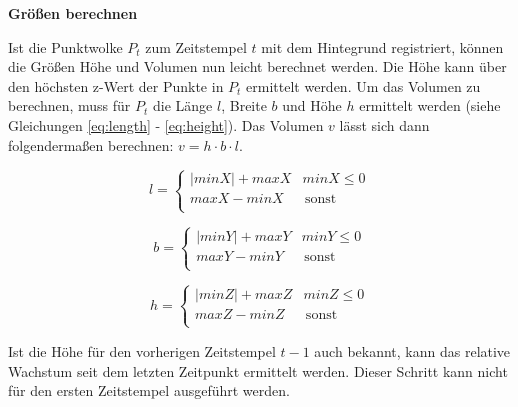 \documentclass[12pt,titlepage, twoside]{article}
\begin{document}
\textbf{Größen berechnen}

Ist die Punktwolke $P_t$ zum Zeitstempel $t$ mit dem Hintegrund registriert, können die Größen Höhe und Volumen nun leicht berechnet werden.
Die Höhe kann über den höchsten z-Wert der Punkte in $P_t$ ermittelt werden. Um das Volumen zu berechnen, muss für $P_t$ die Länge $l$, Breite $b$ und Höhe $h$ ermittelt werden (siehe Gleichungen \ref{eq:length} - \ref{eq:height}). 
Das Volumen $v$ lässt sich dann folgendermaßen berechnen: $v = h \cdot b \cdot l$.

\begin{equation}
    \label{eq:length}
    l = \left\{
    \begin{array}{ll}
    |minX| + maxX & minX \leq 0 \\
    maxX - minX & \, \textrm{sonst} \\
    \end{array}
    \right. 
\end{equation}

\begin{equation}
    \label{eq:width}
    b = \left\{
    \begin{array}{ll}
    |minY| + maxY & minY \leq 0 \\
    maxY - minY & \, \textrm{sonst} \\
    \end{array}
    \right. 
\end{equation}

\begin{equation}
    \label{eq:height}
    h = \left\{
    \begin{array}{ll}
    |minZ| + maxZ & minZ \leq 0 \\
    maxZ - minZ & \, \textrm{sonst} \\
    \end{array}
    \right. 
\end{equation}

Ist die Höhe für den vorherigen Zeitstempel $t-1$ auch bekannt, kann das relative Wachstum seit dem letzten Zeitpunkt ermittelt werden. Dieser Schritt kann nicht für den ersten Zeitstempel ausgeführt werden.
\end{document}
